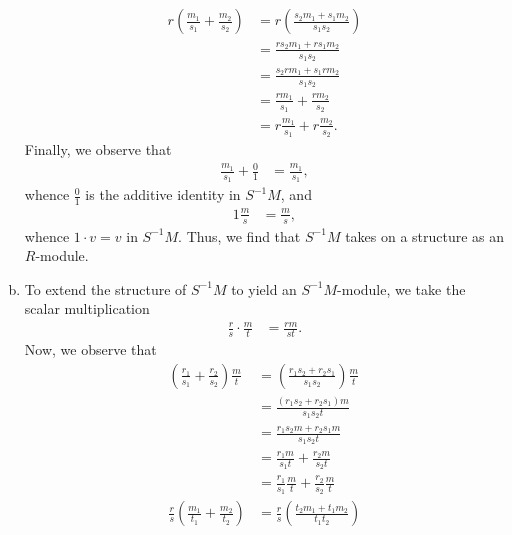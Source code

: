\documentclass[10pt]{mypackage}
\begin{document}
\begin{solution}
\begin{enumerate}[(a)]
\begin{align*}
        r\left( \frac{m_1}{s_1} + \frac{m_2}{s_2} \right) &= r\left( \frac{s_2m_1 + s_1m_2}{s_1s_2} \right)\\
                                                          &= \frac{rs_2m_1 + rs_1m_2}{s_1s_2}\\
                                                          &= \frac{s_2rm_1 + s_1rm_2}{s_1s_2}\\
                                                          &= \frac{rm_1}{s_1} + \frac{rm_2}{s_2}\\
                                                          &= r\frac{m_1}{s_1} + r\frac{m_2}{s_2}.
      \end{align*}
      Finally, we observe that
      \begin{align*}
        \frac{m_1}{s_1} + \frac{0}{1} &= \frac{m_1}{s_1},
      \end{align*}
      whence $\frac{0}{1}$ is the additive identity in $S^{-1}M$, and
      \begin{align*}
        1\frac{m}{s} &= \frac{m}{s},
      \end{align*}
      whence $1\cdot v = v$ in $S^{-1}M$. Thus, we find that $S^{-1}M$ takes on a structure as an $R$-module.
    \item To extend the structure of $S^{-1}M$ to yield an $S^{-1}M$-module, we take the scalar multiplication
      \begin{align*}
        \frac{r}{s} \cdot \frac{m}{t} &= \frac{rm}{st}.
      \end{align*}
      Now, we observe that
      \begin{align*}
        \left( \frac{r_1}{s_1} + \frac{r_2}{s_2} \right) \frac{m}{t} &= \left( \frac{r_1s_2 + r_2s_1}{s_1s_2} \right)\frac{m}{t}\\
                                                                     &= \frac{\left( r_1s_2 + r_2s_1 \right)m}{s_1s_2 t}\\
                                                                     &= \frac{r_1s_2 m + r_2s_1 m}{s_1s_2 t}\\
                                                                     &= \frac{r_1 m}{s_1 t} + \frac{r_2 m}{s_2 t}\\
                                                                     &= \frac{r_1}{s_1} \frac{m}{t} + \frac{r_2}{s_2}\frac{m}{t}\\
        \frac{r}{s}\left( \frac{m_1}{t_1} + \frac{m_2}{t_2} \right) &= \frac{r}{s}\left( \frac{t_2m_1 + t_1m_2}{t_1t_2} \right)\\

\end{align*}
\end{enumerate}
\end{solution}
\end{document}
